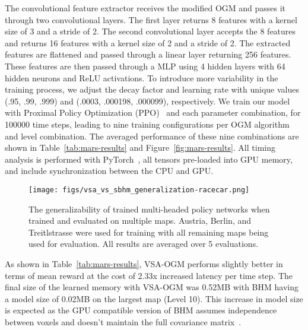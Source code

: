 The convolutional feature extractor receives the modified OGM and passes it through two convolutional layers. The first layer returns 8 features with a kernel size of 3 and a stride of 2. The second convolutional layer accepts the 8 features and returns 16 features with a kernel size of 2 and a stride of 2. The extracted features are flattened and passed through a linear layer returning 256 features. These features are then passed through a MLP using 4 hidden layers with 64 hidden neurons and ReLU activations. To introduce more variability in the training process, we adjust the decay factor and learning rate with unique values (.95, .99, .999) and (.0003, .000198, .000099), respectively. We train our model with Proximal Policy Optimization (PPO)~\cite{schulman2017proximalpolicyoptimizationalgorithms} and each parameter combination, for 100000 time steps, leading to nine training configurations per OGM algorithm and level combination. The averaged performance of these nine combinations are shown in Table~\ref{tab:mars-results} and Figure~\ref{fig:mars-results}. All timing analysis is performed with PyTorch~\cite{paszke2019pytorchimperativestylehighperformance}, all tensors pre-loaded into GPU memory, and include synchronization between the CPU and GPU.

\begin{figure*}[t]
    \centering
    \texttt{[image: figs/vsa\_vs\_sbhm\_generalization-racecar.png]}
    \caption{The generalizability of trained multi-headed policy networks when trained and evaluated on multiple maps. Austria, Berlin, and Treitlstrasse were used for training with all remaining maps being used for evaluation. All results are averaged over 5 evaluations.}
    \label{fig:generalization-results}
\end{figure*}

As shown in Table~\ref{tab:mars-results}, VSA-OGM performs slightly better in terms of mean reward at the cost of 2.33x increased latency per time step.
The final size of the learned memory with VSA-OGM was 0.52MB with BHM having a model size of 0.02MB on the largest map (Level 10). This increase in model size is expected as the GPU compatible version of BHM assumes independence between voxels and doesn't maintain the full covariance matrix~\cite{snyder2024brain, senanayake2017bayesian}. 

